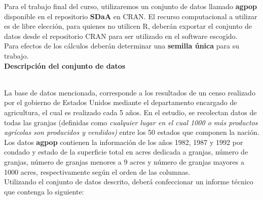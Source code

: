 
Para el trabajo final del curso, utilizaremos un conjunto de datos llamado \textbf{agpop} disponible en el repositorio \textbf{SDaA} en CRAN. El recurso computacional a utilizar es de libre elección, para quienes no utilicen R, deberán exportar el conjunto de datos desde el repositorio CRAN para ser utilizado en el software escogido.\\

Para efectos de los cálculos deberán determinar una \textbf{semilla única} para su trabajo.\\

\textbf{Descripción del conjunto de datos}

\\
La base de datos mencionada, corresponde a los resultados de un censo realizado por el gobierno de Estados Unidos mediante el departamento encargado de agricultura, el cual es realizado cada 5 años. En el estudio, se recolectan datos de todas las granjas (definidas como \textit{cualquier lugar en el cual 1000 o más productos agrícolas son producidos y vendidos)} entre los 50 estados que componen la nación.\\

Los datos \textbf{agpop} contienen la información de los años 1982, 1987 y 1992 por condado y estado de la superficie total en acres dedicada a granjas, número de granjas, número de granjas menores a 9 acres y número de granjas mayores a 1000 acres, respectivamente según el orden de las columnas.\\

Utilizando el conjunto de datos descrito, deberá confeccionar un informe técnico que contenga lo siguiente:

